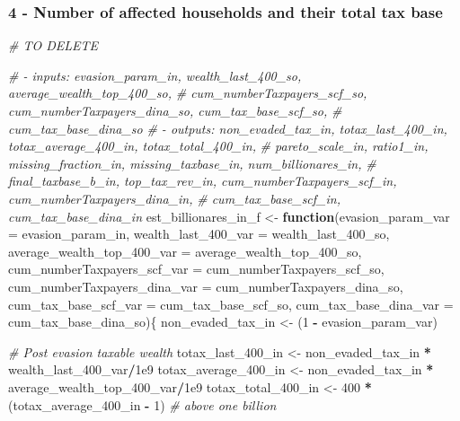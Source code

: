 \documentclass[]{article}
\newenvironment{Shaded}{\begin{snugshade}}{\end{snugshade}}
\newcommand{\CommentTok}[1]{\textcolor[rgb]{0.56,0.35,0.01}{\textit{#1}}}
\newcommand{\ControlFlowTok}[1]{\textcolor[rgb]{0.13,0.29,0.53}{\textbf{#1}}}
\newcommand{\DataTypeTok}[1]{\textcolor[rgb]{0.13,0.29,0.53}{#1}}
\newcommand{\DecValTok}[1]{\textcolor[rgb]{0.00,0.00,0.81}{#1}}
\newcommand{\FloatTok}[1]{\textcolor[rgb]{0.00,0.00,0.81}{#1}}
\newcommand{\NormalTok}[1]{#1}
\newcommand{\OperatorTok}[1]{\textcolor[rgb]{0.81,0.36,0.00}{\textbf{#1}}}
\newcommand{\StringTok}[1]{\textcolor[rgb]{0.31,0.60,0.02}{#1}}
\begin{document}
\hypertarget{number-of-affected-households-and-their-total-tax-base}{%
\subsubsection{4 - Number of affected households and their total tax
base}\label{number-of-affected-households-and-their-total-tax-base}}

\begin{Shaded}
\begin{Highlighting}[]
\CommentTok{# TO DELETE}

\CommentTok{# - inputs: evasion_param_in, wealth_last_400_so, average_wealth_top_400_so,  }
\CommentTok{# cum_numberTaxpayers_scf_so, cum_numberTaxpayers_dina_so, cum_tax_base_scf_so,  }
\CommentTok{# cum_tax_base_dina_so }
\CommentTok{# - outputs: non_evaded_tax_in, totax_last_400_in, totax_average_400_in, totax_total_400_in, }
\CommentTok{# pareto_scale_in, ratio1_in, missing_fraction_in, missing_taxbase_in, num_billionares_in, }
\CommentTok{# final_taxbase_b_in, top_tax_rev_in, cum_numberTaxpayers_scf_in, cum_numberTaxpayers_dina_in, }
\CommentTok{# cum_tax_base_scf_in, cum_tax_base_dina_in }
\NormalTok{est_billionares_in_f <-}\StringTok{ }\ControlFlowTok{function}\NormalTok{(}\DataTypeTok{evasion_param_var =}\NormalTok{ evasion_param_in, }
                                 \DataTypeTok{wealth_last_400_var =}\NormalTok{ wealth_last_}\DecValTok{400}\NormalTok{_so,}
                                 \DataTypeTok{average_wealth_top_400_var =}\NormalTok{ average_wealth_top_}\DecValTok{400}\NormalTok{_so,}
                                 \DataTypeTok{cum_numberTaxpayers_scf_var =}\NormalTok{ cum_numberTaxpayers_scf_so,}
                                 \DataTypeTok{cum_numberTaxpayers_dina_var =}\NormalTok{ cum_numberTaxpayers_dina_so, }
                                 \DataTypeTok{cum_tax_base_scf_var =}\NormalTok{ cum_tax_base_scf_so, }
                                 \DataTypeTok{cum_tax_base_dina_var =}\NormalTok{ cum_tax_base_dina_so)\{}
\NormalTok{    non_evaded_tax_in <-}\StringTok{ }\NormalTok{(}\DecValTok{1} \OperatorTok{-}\StringTok{ }\NormalTok{evasion_param_var)}
     
    \CommentTok{# Post evasion taxable wealth}
\NormalTok{    totax_last_}\DecValTok{400}\NormalTok{_in <-}\StringTok{ }\NormalTok{non_evaded_tax_in }\OperatorTok{*}\StringTok{ }\NormalTok{wealth_last_}\DecValTok{400}\NormalTok{_var}\OperatorTok{/}\FloatTok{1e9}                 
\NormalTok{    totax_average_}\DecValTok{400}\NormalTok{_in <-}\StringTok{ }\NormalTok{non_evaded_tax_in }\OperatorTok{*}\StringTok{ }\NormalTok{average_wealth_top_}\DecValTok{400}\NormalTok{_var}\OperatorTok{/}\FloatTok{1e9}       
\NormalTok{    totax_total_}\DecValTok{400}\NormalTok{_in <-}\StringTok{ }\DecValTok{400} \OperatorTok{*}\StringTok{ }\NormalTok{(totax_average_}\DecValTok{400}\NormalTok{_in }\OperatorTok{-}\StringTok{ }\DecValTok{1}\NormalTok{)                     }\CommentTok{# above one billion}
      

\end{Highlighting}
\end{Shaded}
\end{document}
